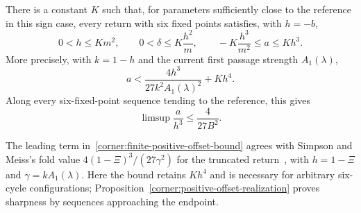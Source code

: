 \begin{proposition}
\label{corner:secondary-bounds}
\label{corner:sharp-positive-offset}
\label{corner:positive-offset-bound}
There is a constant $K$ such that, for parameters sufficiently close to the
reference in this sign case, every return with six fixed points satisfies,
with $h=-b$,
\begin{equation}\label{corner:strong-bounds}
 0<h\leq Km^2,\qquad
 0<\delta\leq K\frac{h^2}{m},\qquad
 -K\frac{h^3}{m^2}\leq a\leq Kh^3.
\end{equation}
More precisely, with $k=1-h$ and the current first passage strength
$A_1(\lambda)$,
\begin{equation}\label{corner:finite-positive-offset-bound}
 a<\frac{4h^3}{27k^2A_1(\lambda)^2}+Kh^4.
\end{equation}
Along every six-fixed-point sequence tending to the reference, this gives
\begin{equation}\label{corner:sharp-positive-offset-limsup}
 \limsup\frac{a}{h^3}\leq\frac{4}{27B^2}.
\end{equation}
\end{proposition}

The leading term in~\eqref{corner:finite-positive-offset-bound} agrees with
Simpson and Meiss's fold value $4(1-\Xi)^3/(27\gamma^2)$ for the truncated
return~\cite[arXiv version, Eq.~(72)]{simpsonmeiss2008}, with $h=1-\Xi$ and
$\gamma=kA_1(\lambda)$. Here the bound retains $Kh^4$ and is necessary for
arbitrary six-cycle configurations; Proposition~\ref{corner:positive-offset-realization}
proves sharpness by sequences approaching the endpoint.

